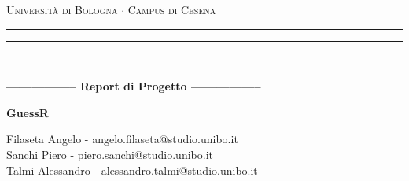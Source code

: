 \begin{titlepage}
    \begin{center}
        {{\Large{\textsc{Università di Bologna $\cdot$ Campus di Cesena }}}}
        \rule[0.1cm]{15.8cm}{0.1mm}
        \rule[0.5cm]{15.8cm}{0.6mm}
        \\
        \vspace{3mm}
    \end{center}
    \vspace{2mm}
    \begin{center}
        {\LARGE{\bf{----------------- Report di Progetto -----------------}}}
        \vspace{5mm} \par \noindent
        {\Huge{\bf{GuessR}}}
        \vspace{10mm} \par \noindent
        {\Large Filaseta Angelo - angelo.filaseta@studio.unibo.it \\
        Sanchi Piero - piero.sanchi@studio.unibo.it \\
        Talmi Alessandro - alessandro.talmi@studio.unibo.it}
    \end{center}
    \hfill
    \vspace{40mm}
\end{titlepage}
